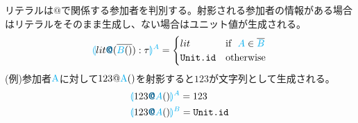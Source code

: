 \documentclass{thesis}
\newcommand{\projection}[2]{{\color{cyan}\llparenthesis}#1{\color{cyan}\rrparenthesis^#2}}
\newcommand{\mblue}[1]{\textbf{\textsf{\color{MidnightBlue}#1}}}
\newcommand{\cyan}[1]{\color{cyan}#1}
\begin{document}
リテラルは$@$で関係する参加者を判別する。射影される参加者の情報がある場合はリテラルをそのまま生成し、ない場合はユニット値が生成される。
\begin{alignat*}{2} 
  &\projection{lit\mblue{@}(\overline{{\color{cyan}{B}}()}):\tau}{A}=
  \begin{cases}
    lit & \text{if}~~ {\color{cyan}A} \in \overline{\color{cyan}{B}}\\
    \texttt{Unit.id} &\text{otherwise}
  \end{cases}\\
\end{alignat*}
(例)参加者$\cyan{\text{A}}$に対して$123@{\cyan{\text{A}}}()$を射影すると$123$が文字列として生成される。
\begin{alignat*}{2} 
  &\projection{123\mblue{@}{\color{cyan}{A}}()}{A} = 123\\
  &\projection{123\mblue{@}{\color{cyan}{A}}()}{B} = \texttt{Unit.id}
\end{alignat*}
\end{document}
